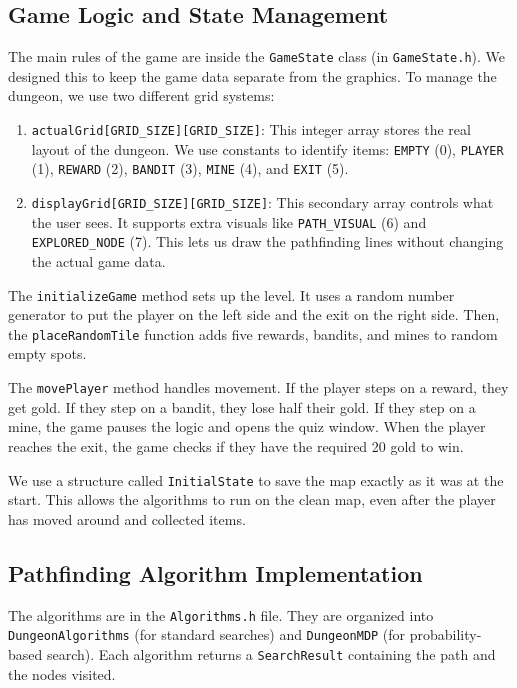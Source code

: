 \documentclass[12pt, a4paper]{article}
\newcommand{\code}[1]{\texttt{#1}}
\begin{document}
\subsection{Game Logic and State Management}
The main rules of the game are inside the \code{GameState} class (in \code{GameState.h}). We designed this to keep the game data separate from the graphics. To manage the dungeon, we use two different grid systems:

\begin{enumerate}
    \item \code{actualGrid[GRID\_SIZE][GRID\_SIZE]}: This integer array stores the real layout of the dungeon. We use constants to identify items: \code{EMPTY} (0), \code{PLAYER} (1), \code{REWARD} (2), \code{BANDIT} (3), \code{MINE} (4), and \code{EXIT} (5).
    \item \code{displayGrid[GRID\_SIZE][GRID\_SIZE]}: This secondary array controls what the user sees. It supports extra visuals like \code{PATH\_VISUAL} (6) and \code{EXPLORED\_NODE} (7). This lets us draw the pathfinding lines without changing the actual game data.
\end{enumerate}

The \code{initializeGame} method sets up the level. It uses a random number generator to put the player on the left side and the exit on the right side. Then, the \code{placeRandomTile} function adds five rewards, bandits, and mines to random empty spots.

The \code{movePlayer} method handles movement. If the player steps on a reward, they get gold. If they step on a bandit, they lose half their gold. If they step on a mine, the game pauses the logic and opens the quiz window. When the player reaches the exit, the game checks if they have the required 20 gold to win.

We use a structure called \code{InitialState} to save the map exactly as it was at the start. This allows the algorithms to run on the clean map, even after the player has moved around and collected items.

\subsection{Pathfinding Algorithm Implementation}
The algorithms are in the \code{Algorithms.h} file. They are organized into \code{DungeonAlgorithms} (for standard searches) and \code{DungeonMDP} (for probability-based search). Each algorithm returns a \code{SearchResult} containing the path and the nodes visited.
\end{document}
